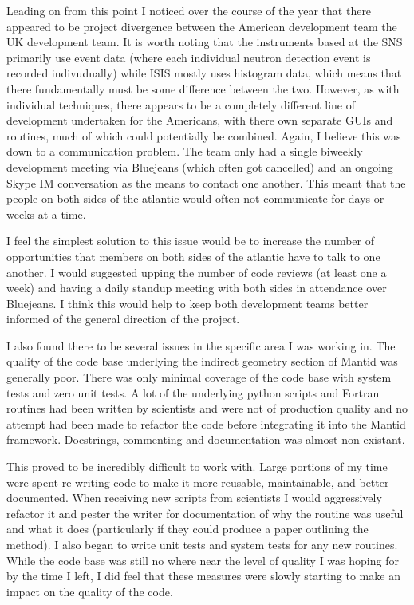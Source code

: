 \documentclass[paper=a4, fontsize=11pt]{scrartcl}	%
\numberwithin{equation}{section}															%
\numberwithin{figure}{section}																%
\numberwithin{table}{section}
\begin{document}
Leading on from this point I noticed over the course of the year that
there appeared to be project divergence between the American development
team the UK development team. It is worth noting that the instruments
based at the SNS primarily use event data (where each individual neutron
detection event is recorded indivudually) while ISIS mostly uses
histogram data, which means that there fundamentally must be some
difference between the two. However, as with individual techniques,
there appears to be a completely different line of development
undertaken for the Americans, with there own separate GUIs and routines,
much of which could potentially be combined. Again, I believe this was
down to a communication problem. The team only had a single biweekly
development meeting via Bluejeans (which often got cancelled) and an
ongoing Skype IM conversation as the means to contact one another. This
meant that the people on both sides of the atlantic would often not
communicate for days or weeks at a time.

I feel the simplest solution to this issue would be to increase the
number of opportunities that members on both sides of the atlantic have
to talk to one another. I would suggested upping the number of code
reviews (at least one a week) and having a daily standup meeting with
both sides in attendance over Bluejeans. I think this would help to keep
both development teams better informed of the general direction of the
project.

I also found there to be several issues in the specific area I was
working in. The quality of the code base underlying the indirect
geometry section of Mantid was generally poor. There was only minimal
coverage of the code base with system tests and zero unit tests. A lot
of the underlying python scripts and Fortran routines had been written
by scientists and were not of production quality and no attempt had been
made to refactor the code before integrating it into the Mantid
framework. Docstrings, commenting and documentation was almost
non-existant.

This proved to be incredibly difficult to work with. Large portions of
my time were spent re-writing code to make it more reusable,
maintainable, and better documented. When receiving new scripts from
scientists I would aggressively refactor it and pester the writer for
documentation of why the routine was useful and what it does
(particularly if they could produce a paper outlining the method). I
also began to write unit tests and system tests for any new routines.
While the code base was still no where near the level of quality I was
hoping for by the time I left, I did feel that these measures were
slowly starting to make an impact on the quality of the code.
\end{document}
